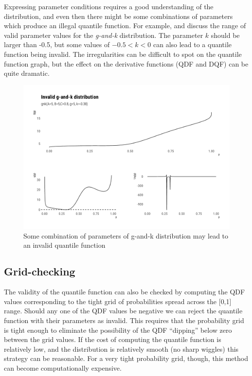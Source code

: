 \documentclass[ba]{imsart}
\numberwithin{equation}{section}
\theoremstyle{plain}
\begin{document}
Expressing parameter conditions requires a good understanding of the distribution, and even then there might be some combinations of parameters which produce an illegal quantile function. For example, \citet{prangle2017GkPackageGandk} and \citet{rayner2002NumericalMaximumLikelihood} discuss the range of valid parameter values for the \emph{g-and-k} distribution. The parameter \(k\) should be larger than -0.5, but some values of \(-0.5<k<0\) can also lead to a quantile function being invalid. The irregularities can be difficult to spot on the quantile function graph, but the effect on the derivative functions (QDF and DQF) can be quite dramatic.

\begin{figure}

{\centering \includegraphics[width=0.8\linewidth]{BA-submission_files/figure-latex/invalid-gnk-graph-1} 

}

\caption{Some combination of parameters of g-and-k distribution may lead to an invalid quantile function}\label{fig:invalid-gnk-graph}
\end{figure}

\hypertarget{grid-checking}{%
\subsection{Grid-checking}\label{grid-checking}}

The validity of the quantile function can also be checked by computing the QDF values corresponding to the tight grid of probabilities spread across the {[}0,1{]} range. Should any one of the QDF values be negative we can reject the quantile function with their parameters as invalid. This requires that the probability grid is tight enough to eliminate the possibility of the QDF ``dipping'' below zero between the grid values. If the cost of computing the quantile function is relatively low, and the distribution is relatively smooth (no sharp wiggles) this strategy can be reasonable. For a very tight probability grid, though, this method can become computationally expensive.
\end{document}
